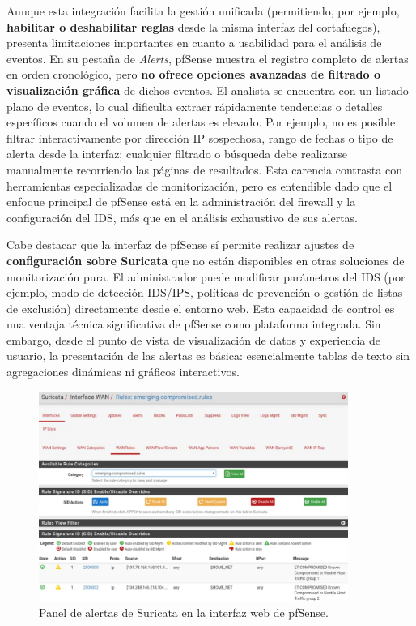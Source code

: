 \documentclass[11pt,a4paper,twoside]{report}
\begin{document}
Aunque esta integración facilita la gestión unificada (permitiendo, por ejemplo, \textbf{habilitar o deshabilitar reglas} desde la misma interfaz del cortafuegos), presenta limitaciones importantes en cuanto a usabilidad para el análisis de eventos. En su pestaña de \emph{Alerts}, pfSense muestra el registro completo de alertas en orden cronológico, pero \textbf{no ofrece opciones avanzadas de filtrado o visualización gráfica} de dichos eventos. El analista se encuentra con un listado plano de eventos, lo cual dificulta extraer rápidamente tendencias o detalles específicos cuando el volumen de alertas es elevado. Por ejemplo, no es posible filtrar interactivamente por dirección IP sospechosa, rango de fechas o tipo de alerta desde la interfaz; cualquier filtrado o búsqueda debe realizarse manualmente recorriendo las páginas de resultados. Esta carencia contrasta con herramientas especializadas de monitorización, pero es entendible dado que el enfoque principal de pfSense está en la administración del firewall y la configuración del IDS, más que en el análisis exhaustivo de sus alertas.\newline

Cabe destacar que la interfaz de pfSense sí permite realizar ajustes de \textbf{configuración sobre Suricata} que no están disponibles en otras soluciones de monitorización pura. El administrador puede modificar parámetros del IDS (por ejemplo, modo de detección IDS/IPS, políticas de prevención o gestión de listas de exclusión) directamente desde el entorno web. Esta capacidad de control es una ventaja técnica significativa de pfSense como plataforma integrada. Sin embargo, desde el punto de vista de visualización de datos y experiencia de usuario, la presentación de las alertas es básica: esencialmente tablas de texto sin agregaciones dinámicas ni gráficos interactivos.

\begin{figure}[hbtp]
	\centering
	\includegraphics[width=0.9\textwidth]{documento/1.png}
	\caption{Panel de alertas de Suricata en la interfaz web de pfSense.}
	\label{fig:pfsense-alerts}
\end{figure}
\end{document}
